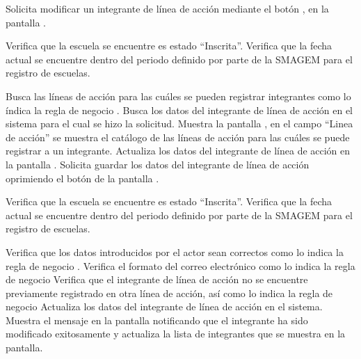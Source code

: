  \begin{UCtrayectoria}
    \UCpaso[\UCactor] Solicita modificar un integrante de línea de acción mediante el botón \botEdit, en la pantalla .

    \UCpaso[\UCsist] Verifica que la escuela se encuentre es estado ``Inscrita''. 
    \UCpaso[\UCsist] Verifica que la fecha actual se encuentre dentro del periodo definido por parte de la SMAGEM para el registro de escuelas.     
    
   \UCpaso[\UCsist] Busca las líneas de acción para las cuáles se pueden registrar integrantes como lo índica la regla de negocio .       
    \UCpaso[\UCsist] Busca los datos del integrante de línea de acción en el sistema para el cual se hizo la solicitud.   
    \UCpaso[\UCsist] Muestra la pantalla , en el campo ``Linea de acción'' se muestra el catálogo de las líneas de acción para las cuáles se puede registrar a un integrante.
    \UCpaso[\UCactor] Actualiza los datos del integrante de línea de acción en la pantalla . \label{cur15:Acciones}
    \UCpaso[\UCactor] Solicita guardar los datos del integrante de línea de acción oprimiendo el botón  de la pantalla . 

    \UCpaso[\UCsist] Verifica que la escuela se encuentre es estado ``Inscrita''. 
    \UCpaso[\UCsist] Verifica que la fecha actual se encuentre dentro del periodo definido por parte de la SMAGEM para el registro de escuelas.     
    
    \UCpaso[\UCsist] Verifica que los datos introducidos por el actor sean correctos como lo indica la regla de negocio .    
   \UCpaso[\UCsist] Verifica el formato del correo electrónico como lo indica la regla de negocio   
   \UCpaso[\UCsist] Verifica que el integrante de línea de acción no se encuentre previamente registrado en otra línea de acción, así como lo indica la regla de negocio         
    \UCpaso[\UCsist] Actualiza los datos del integrante de línea de acción en el sistema.
    \UCpaso[\UCsist] Muestra el mensaje  en la pantalla  notificando que el integrante ha sido modificado exitosamente y actualiza la lista de integrantes que se muestra en la pantalla.
 \end{UCtrayectoria}


